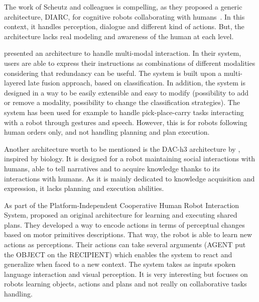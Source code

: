 \documentclass[a4paper,11pt,twoside]{StyleThese}
\begin{document}
The work of Scheutz and colleagues is compelling, as they proposed a generic architecture, DIARC, for cognitive robots collaborating with humans~\citep{scheutz_2006_utility,scheutz_2019_overview}. In this context, it handles perception, dialogue and different kind of actions. But, the architecture lacks real modeling and awareness of the human at each level.

\cite{rossi_2013_extensible} presented an architecture to handle multi-modal interaction. In their system, users are able to express their instructions as combinations of different modalities considering that redundancy can be useful. The system is built upon a multi-layered late fusion approach, based on classification. In addition, the system is designed in a way to be easily extensible and easy to modify (\eg possibility to add or remove a modality, possibility to change the classification strategies). The system has been used for example to handle pick-place-carry tasks interacting with a robot through gestures and speech. However, this is for robots following human orders only, and not handling planning and plan execution.

Another architecture worth to be mentioned is the DAC-h3 architecture by \cite{moulin_2017_dac}, inspired by biology. It is designed for a robot maintaining social interactions with humans, able to tell narratives and to acquire knowledge thanks to its interactions with humans. As it is mainly dedicated to knowledge acquisition and expression, it lacks planning and execution abilities.

As part of the Platform-Independent Cooperative Human Robot Interaction System, \cite{lallee_2012_towards} proposed an original architecture for learning and executing shared plans. They developed a way to encode actions in terms of perceptual changes based on motor primitives descriptions. That way, the robot is able to learn new actions as perceptions. Their actions can take several arguments (\eg AGENT put the OBJECT on the RECIPIENT) which enables the system to react and generalize when faced to a new context. The system takes as inputs spoken language interaction and visual perception. It is very interesting but focuses on robots learning objects, actions and plans and not really on collaborative tasks handling. 
\end{document}
